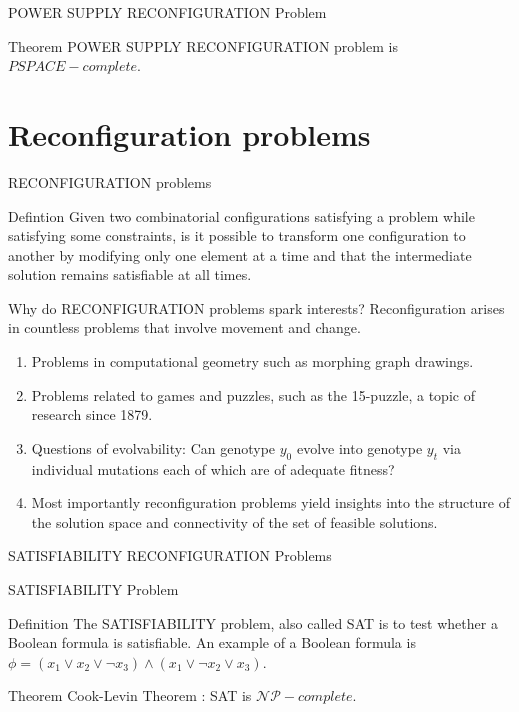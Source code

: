 \begin{frame}{POWER SUPPLY RECONFIGURATION Problem}
\begin{block}{Theorem}
POWER SUPPLY RECONFIGURATION problem is $PSPACE-complete$.
\end{block}

\end{frame}

\section{Reconfiguration problems}
\begin{frame}{RECONFIGURATION problems}
  \begin{block}{Defintion}
    Given two combinatorial configurations satisfying a problem while satisfying some constraints, is it possible to transform one configuration to another by modifying only one element at a time and that the intermediate solution remains satisfiable at all times.
  \end{block}
\end{frame}


\begin{frame}{Why do RECONFIGURATION problems spark interests?}
  Reconfiguration arises in countless problems that involve movement and change.
  \begin{enumerate}
    \item Problems in computational geometry such as morphing graph drawings.
    \item Problems related to games and puzzles, such as the 15-puzzle, a topic of research since 1879.
    \item Questions of evolvability: Can genotype $y_0$ evolve into genotype $y_t$ via individual mutations each of which are of
          adequate fitness?
    \item Most importantly reconfiguration problems yield insights into the structure of the solution space and connectivity of the set of feasible solutions.
  \end{enumerate}
\end{frame}

\begin{frame}{SATISFIABILITY RECONFIGURATION Problems}
  \begin{block}{SATISFIABILITY Problem}
      \begin{block}{Definition}
      The SATISFIABILITY problem, also called SAT is to test whether a Boolean formula is satisfiable. An example of a Boolean formula is $\phi = (x_1 \vee x_2 \vee \neg x_3) \wedge (x_1 \vee \neg x_2 \vee x_3)$.
      \end{block}

      \begin{block}{Theorem}
      Cook-Levin Theorem : SAT is $\mathcal{NP}-complete.$
      \end{block}
  \end{block}

\end{frame}

